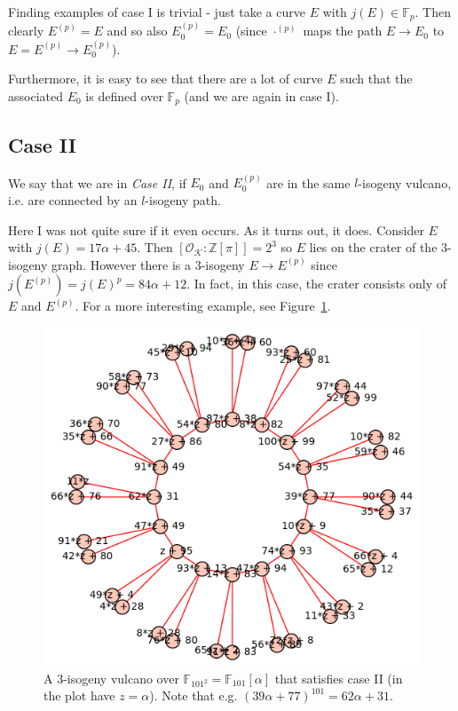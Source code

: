 \documentclass{scrartcl}
\newcommand{\Z}{\mathbb{Z}}
\newcommand{\F}{\mathbb{F}}
\newcommand{\K}{\mathcal{K}}
\renewcommand{\O}{\mathcal{O}}
\theoremstyle{definition}
\begin{document}
Finding examples of case I is trivial - just take a curve $E$ with $j(E) \in \F_p$.
Then clearly $E^{(p)} = E$ and so also $E_0^{(p)} = E_0$ (since $\cdot^{(p)}$ maps the path $E \to E_0$ to $E = E^{(p)} \to E_0^{(p)}$).

Furthermore, it is easy to see that there are a lot of curve $E$ such that the associated $E_0$ is defined over $\F_p$ (and we are again in case I).

\subsection{Case II}
We say that we are in \emph{Case II}, if $E_0$ and $E_0^{(p)}$ are in the same $l$-isogeny vulcano, i.e. are connected by an $l$-isogeny path.

Here I was not quite sure if it even occurs. As it turns out, it does.
Consider $E$ with $j(E) = 17\alpha + 45$.
Then $[\O_\K : \Z[\pi]] = 2^3$ so $E$ lies on the crater of the 3-isogeny graph.
However there is a 3-isogeny $E \to E^{(p)}$ since $j(E^{(p)}) = j(E)^p = 84 \alpha + 12$.
In fact, in this case, the crater consists only of $E$ and $E^{(p)}$.
For a more interesting example, see Figure~\ref{fig:example_II}.
\begin{figure}
    \includegraphics{./example_II.png}
    \caption{\label{fig:example_II} A 3-isogeny vulcano over $\F_{101^2} = \F_{101}[\alpha]$ that satisfies case II (in the plot have $z = \alpha$). Note that e.g. $(39\alpha + 77)^{101} = 62\alpha + 31$.}
\end{figure}
\end{document}
